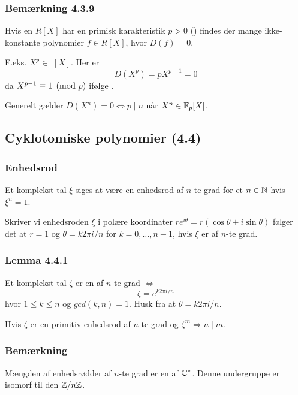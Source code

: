 \subsubsection{Bemærkning 4.3.9}
\label{Bemaerkning 4.3.9}
Hvis en $R[X]$ har en primisk karakteristik $p > 0$
() findes der mange ikke-konstante polynomier
$f \in R[X]$, hvor $D(f) = 0$.

F.eks. $X^p \in $ $[X]$. Her er
\begin{equation*}
  D(X^p) = pX^{p-1} = 0
\end{equation*}
da $X^{p-1} \equiv 1 \pmod{p}$ ifølge .

Generelt gælder $D(X^n) = 0 \iff p \mid n$ når $X^n \in \mathbb{F}_p [X]$.

\subsection{Cyklotomiske polynomier (4.4)}
\label{Cyklotomiske polynomier (4.4)}
\subsubsection{Enhedsrod}
\label{Enhedsrod}
Et komplekst tal $\xi$ siges at være en enhedsrod af $n$-te grad for et $n \in
\mathbb{N}$ hvis $\xi^n = 1$.

Skriver vi enhedsroden $\xi$ i polære koordinater $re^{i\theta} = r(\cos\theta
+ i \sin \theta)$ følger det at $r = 1$ og $\theta = k2\pi i/n$ for $k =
0,\ldots,n-1$, hvis $\xi$ er af $n$-te grad.

\subsubsection{Lemma 4.4.1}
\label{Lemma 4.4.1}
Et komplekst tal $\zeta$ er en  af $n$-te grad
$\iff$
\begin{equation*}
  \zeta = e^{k2\pi i/n}
\end{equation*}
hvor $1 \leq k \leq n$ og $gcd(k,n) = 1$. Husk fra  at
$\theta = k2\pi i/n$.

Hvis $\zeta$ er en primitiv enhedsrod af $n$-te grad og $\zeta^m \Rightarrow n
\mid m$.

\subsubsection{Bemærkning}
\label{Bemaerkning}
Mængden af enhedsrødder af $n$-te grad er en  af $\mathbb{C}^*$.
Denne undergruppe er isomorf til den  $\mathbb{Z}/n\mathbb{Z}$.

